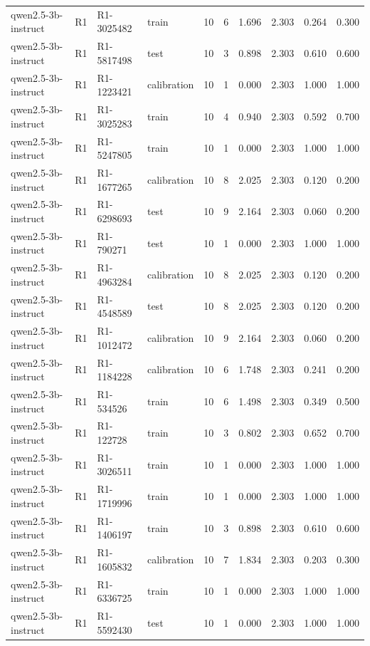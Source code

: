 \begin{table}
\begin{tabular}{llllrrrrrr}
qwen2.5-3b-instruct & R1 & R1-3025482 & train & 10 & 6 & 1.696 & 2.303 & 0.264 & 0.300 \\
qwen2.5-3b-instruct & R1 & R1-5817498 & test & 10 & 3 & 0.898 & 2.303 & 0.610 & 0.600 \\
qwen2.5-3b-instruct & R1 & R1-1223421 & calibration & 10 & 1 & 0.000 & 2.303 & 1.000 & 1.000 \\
qwen2.5-3b-instruct & R1 & R1-3025283 & train & 10 & 4 & 0.940 & 2.303 & 0.592 & 0.700 \\
qwen2.5-3b-instruct & R1 & R1-5247805 & train & 10 & 1 & 0.000 & 2.303 & 1.000 & 1.000 \\
qwen2.5-3b-instruct & R1 & R1-1677265 & calibration & 10 & 8 & 2.025 & 2.303 & 0.120 & 0.200 \\
qwen2.5-3b-instruct & R1 & R1-6298693 & test & 10 & 9 & 2.164 & 2.303 & 0.060 & 0.200 \\
qwen2.5-3b-instruct & R1 & R1-790271 & test & 10 & 1 & 0.000 & 2.303 & 1.000 & 1.000 \\
qwen2.5-3b-instruct & R1 & R1-4963284 & calibration & 10 & 8 & 2.025 & 2.303 & 0.120 & 0.200 \\
qwen2.5-3b-instruct & R1 & R1-4548589 & test & 10 & 8 & 2.025 & 2.303 & 0.120 & 0.200 \\
qwen2.5-3b-instruct & R1 & R1-1012472 & calibration & 10 & 9 & 2.164 & 2.303 & 0.060 & 0.200 \\
qwen2.5-3b-instruct & R1 & R1-1184228 & calibration & 10 & 6 & 1.748 & 2.303 & 0.241 & 0.200 \\
qwen2.5-3b-instruct & R1 & R1-534526 & train & 10 & 6 & 1.498 & 2.303 & 0.349 & 0.500 \\
qwen2.5-3b-instruct & R1 & R1-122728 & train & 10 & 3 & 0.802 & 2.303 & 0.652 & 0.700 \\
qwen2.5-3b-instruct & R1 & R1-3026511 & train & 10 & 1 & 0.000 & 2.303 & 1.000 & 1.000 \\
qwen2.5-3b-instruct & R1 & R1-1719996 & train & 10 & 1 & 0.000 & 2.303 & 1.000 & 1.000 \\
qwen2.5-3b-instruct & R1 & R1-1406197 & train & 10 & 3 & 0.898 & 2.303 & 0.610 & 0.600 \\
qwen2.5-3b-instruct & R1 & R1-1605832 & calibration & 10 & 7 & 1.834 & 2.303 & 0.203 & 0.300 \\
qwen2.5-3b-instruct & R1 & R1-6336725 & train & 10 & 1 & 0.000 & 2.303 & 1.000 & 1.000 \\
qwen2.5-3b-instruct & R1 & R1-5592430 & test & 10 & 1 & 0.000 & 2.303 & 1.000 & 1.000 \\

\end{tabular}
\end{table}
